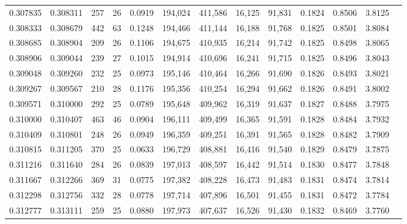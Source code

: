 \begin{tabular}{rrrrrrrrrrrrr}
0.307835 & 0.308311 &    257 &    26 &                                     0.0919 & 194,024 & 411,586 &  16,125 &  91,831 & 0.1824 & 0.8506 & 3.8125 \\
0.308333 & 0.308679 &    442 &    63 &                                     0.1248 & 194,466 & 411,144 &  16,188 &  91,768 & 0.1825 & 0.8501 & 3.8084 \\
0.308685 & 0.308904 &    209 &    26 &                                     0.1106 & 194,675 & 410,935 &  16,214 &  91,742 & 0.1825 & 0.8498 & 3.8065 \\
0.308906 & 0.309044 &    239 &    27 &                                     0.1015 & 194,914 & 410,696 &  16,241 &  91,715 & 0.1825 & 0.8496 & 3.8043 \\
0.309048 & 0.309260 &    232 &    25 &                                     0.0973 & 195,146 & 410,464 &  16,266 &  91,690 & 0.1826 & 0.8493 & 3.8021 \\
0.309267 & 0.309567 &    210 &    28 &                                     0.1176 & 195,356 & 410,254 &  16,294 &  91,662 & 0.1826 & 0.8491 & 3.8002 \\
0.309571 & 0.310000 &    292 &    25 &                                     0.0789 & 195,648 & 409,962 &  16,319 &  91,637 & 0.1827 & 0.8488 & 3.7975 \\
0.310000 & 0.310407 &    463 &    46 &                                     0.0904 & 196,111 & 409,499 &  16,365 &  91,591 & 0.1828 & 0.8484 & 3.7932 \\
0.310409 & 0.310801 &    248 &    26 &                                     0.0949 & 196,359 & 409,251 &  16,391 &  91,565 & 0.1828 & 0.8482 & 3.7909 \\
0.310815 & 0.311205 &    370 &    25 &                                     0.0633 & 196,729 & 408,881 &  16,416 &  91,540 & 0.1829 & 0.8479 & 3.7875 \\
0.311216 & 0.311640 &    284 &    26 &                                     0.0839 & 197,013 & 408,597 &  16,442 &  91,514 & 0.1830 & 0.8477 & 3.7848 \\
0.311667 & 0.312266 &    369 &    31 &                                     0.0775 & 197,382 & 408,228 &  16,473 &  91,483 & 0.1831 & 0.8474 & 3.7814 \\
0.312298 & 0.312756 &    332 &    28 &                                     0.0778 & 197,714 & 407,896 &  16,501 &  91,455 & 0.1831 & 0.8472 & 3.7784 \\
0.312777 & 0.313111 &    259 &    25 &                                     0.0880 & 197,973 & 407,637 &  16,526 &  91,430 & 0.1832 & 0.8469 & 3.7760 \\

\end{tabular}
